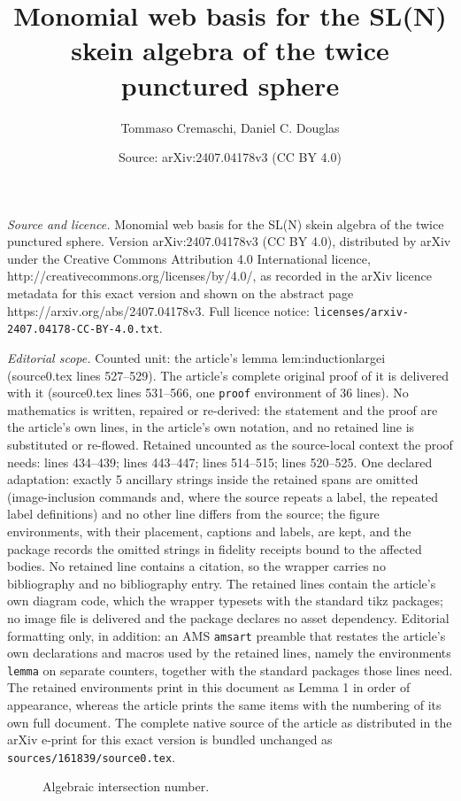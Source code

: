 \documentclass[10pt,a4paper]{amsart}
\title{Monomial web basis for the SL(N) skein algebra of the twice punctured sphere}
\author{Tommaso Cremaschi, Daniel C. Douglas}
\date{Source: arXiv:2407.04178v3 (CC BY 4.0)}
\begin{document}
\maketitle

\noindent\emph{Source and licence.} Monomial web basis for the SL(N) skein algebra of the twice punctured sphere. Version arXiv:2407.04178v3 (CC BY 4.0), distributed by arXiv under the Creative Commons Attribution 4.0 International licence, http://creativecommons.org/licenses/by/4.0/, as recorded in the arXiv licence metadata for this exact version and shown on the abstract page https://arxiv.org/abs/2407.04178v3. Full licence notice: \texttt{licenses/arxiv-2407.04178-CC-BY-4.0.txt}.\par\smallskip

\noindent\textit{Editorial scope.} Counted unit: the article's lemma lem:inductionlargei (source0.tex lines 527--529). The article's complete original proof of it is delivered with it (source0.tex lines 531--566, one \texttt{proof} environment of 36 lines). No mathematics is written, repaired or re-derived: the statement and the proof are the article's own lines, in the article's own notation, and no retained line is substituted or re-flowed.  Retained uncounted as the source-local context the proof needs: lines 434--439; lines 443--447; lines 514--515; lines 520--525.  One declared adaptation: exactly 5 ancillary strings inside the retained spans are omitted (image-inclusion commands and, where the source repeats a label, the repeated label definitions) and no other line differs from the source; the figure environments, with their placement, captions and labels, are kept, and the package records the omitted strings in fidelity receipts bound to the affected bodies.  No retained line contains a citation, so the wrapper carries no bibliography and no bibliography entry.  The retained lines contain the article's own diagram code, which the wrapper typesets with the standard tikz packages; no image file is delivered and the package declares no asset dependency.  Editorial formatting only, in addition: an AMS \texttt{amsart} preamble that restates the article's own declarations and macros used by the retained lines, namely the environments \texttt{lemma} on separate counters, together with the standard packages those lines need.  The retained environments print in this document as Lemma 1 in order of appearance, whereas the article prints the same items with the numbering of its own full document.  The complete native source of the article as distributed in the arXiv e-print for this exact version is bundled unchanged as \texttt{sources/161839/source0.tex}.
\begin{figure}[htb!]
\centering

\caption{Algebraic intersection number.}
\label{fig:fig7}
\end{figure}
\end{document}
